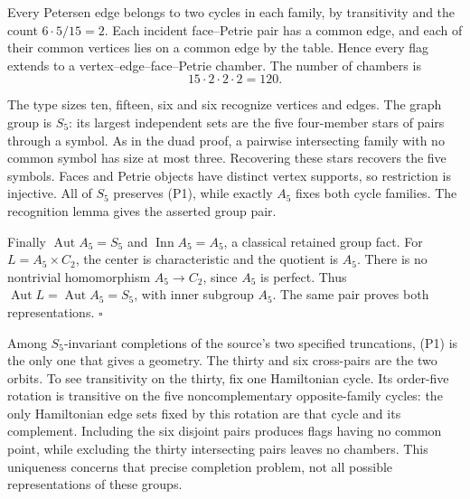 Every Petersen edge belongs to two cycles in each family, by
transitivity and the count \(6\cdot5/15=2\). Each incident face--Petrie
pair has a common edge, and each of their common vertices lies on a
common edge by the table. Hence every flag extends to a
vertex--edge--face--Petrie chamber. The number of chambers is \[
15\cdot2\cdot2\cdot2=120.
\]

The type sizes ten, fifteen, six and six recognize vertices and edges.
The graph group is \(S_5\): its largest independent sets are the five
four-member stars of pairs through a symbol. As in the duad proof, a
pairwise intersecting family with no common symbol has size at most
three. Recovering these stars recovers the five symbols. Faces and
Petrie objects have distinct vertex supports, so restriction is
injective. All of \(S_5\) preserves (P1), while exactly \(A_5\) fixes
both cycle families. The recognition lemma gives the asserted group
pair.

Finally \(\operatorname{Aut}A_5=S_5\) and \(\operatorname{Inn}A_5=A_5\),
a classical retained group fact. For \(L=A_5\times C_2\), the center is
characteristic and the quotient is \(A_5\). There is no nontrivial
homomorphism \(A_5\to C_2\), since \(A_5\) is perfect. Thus
\(\operatorname{Aut}L=\operatorname{Aut}A_5=S_5\), with inner subgroup
\(A_5\). The same pair proves both representations. \(\square\)

Among \(S_5\)-invariant completions of the source's two specified
truncations, (P1) is the only one that gives a geometry. The thirty and
six cross-pairs are the two orbits. To see transitivity on the thirty,
fix one Hamiltonian cycle. Its order-five rotation is transitive on the
five noncomplementary opposite-family cycles: the only Hamiltonian edge
sets fixed by this rotation are that cycle and its complement. Including
the six disjoint pairs produces flags having no common point, while
excluding the thirty intersecting pairs leaves no chambers. This
uniqueness concerns that precise completion problem, not all possible
representations of these groups.
